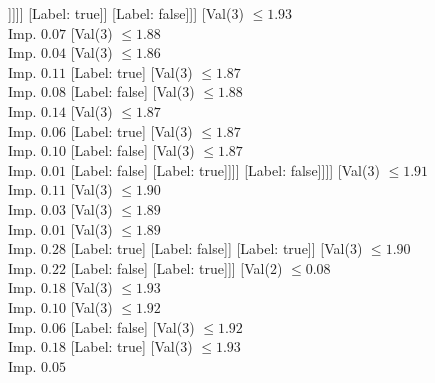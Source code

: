 \documentclass[margin=10pt]{standalone}
\begin{document}
\begin{forest}
									[Val($3$) $ \leq 1.83$ \\ Imp. $0.05$
										[Val($3$) $ \leq 1.82$ \\ Imp. $0.00$
											[Label: false]
											[Val($3$) $ \leq 1.82$ \\ Imp. $0.07$
												[Label: true]
												[Val($3$) $ \leq 1.83$ \\ Imp. $0.01$
													[Label: false]
													[Val($3$) $ \leq 1.83$ \\ Imp. $0.22$
														[Label: true]
														[Label: false]]]]]
										[Label: true]]
									[Label: false]]]
							[Val($3$) $ \leq 1.93$ \\ Imp. $0.07$
								[Val($3$) $ \leq 1.88$ \\ Imp. $0.04$
									[Val($3$) $ \leq 1.86$ \\ Imp. $0.11$
										[Label: true]
										[Val($3$) $ \leq 1.87$ \\ Imp. $0.08$
											[Label: false]
											[Val($3$) $ \leq 1.88$ \\ Imp. $0.14$
												[Val($3$) $ \leq 1.87$ \\ Imp. $0.06$
													[Label: true]
													[Val($3$) $ \leq 1.87$ \\ Imp. $0.10$
														[Label: false]
														[Val($3$) $ \leq 1.87$ \\ Imp. $0.01$
															[Label: false]
															[Label: true]]]]
												[Label: false]]]]
									[Val($3$) $ \leq 1.91$ \\ Imp. $0.11$
										[Val($3$) $ \leq 1.90$ \\ Imp. $0.03$
											[Val($3$) $ \leq 1.89$ \\ Imp. $0.01$
												[Val($3$) $ \leq 1.89$ \\ Imp. $0.28$
													[Label: true]
													[Label: false]]
												[Label: true]]
											[Val($3$) $ \leq 1.90$ \\ Imp. $0.22$
												[Label: false]
												[Label: true]]]
										[Val($2$) $ \leq 0.08$ \\ Imp. $0.18$
											[Val($3$) $ \leq 1.93$ \\ Imp. $0.10$
												[Val($3$) $ \leq 1.92$ \\ Imp. $0.06$
													[Label: false]
													[Val($3$) $ \leq 1.92$ \\ Imp. $0.18$
														[Label: true]
														[Val($3$) $ \leq 1.93$ \\ Imp. $0.05$

\end{forest}
\end{document}
